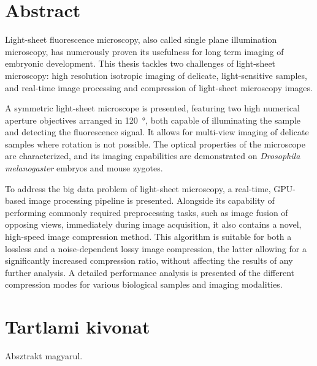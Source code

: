
\chapter*{Abstract}
Light-sheet fluorescence microscopy, also called single plane illumination microscopy, has numerously proven its usefulness for long term imaging of embryonic development. This thesis tackles two challenges of light-sheet microscopy: high resolution isotropic imaging of delicate, light-sensitive samples, and real-time image processing and compression of light-sheet microscopy images.

A symmetric light-sheet microscope is presented, featuring two high numerical aperture objectives arranged in \SI{120}{\degree}, both capable of illuminating the sample and detecting the fluorescence signal. It allows for multi-view imaging of delicate samples where rotation is not possible. The optical properties of the microscope are characterized, and its imaging capabilities are demonstrated on \textit{Drosophila melanogaster} embryos and mouse zygotes.

To address the big data problem of light-sheet microscopy, a real-time, GPU-based image processing pipeline is presented.
Alongside its capability of performing commonly required preprocessing tasks, such as image fusion of opposing views, immediately during image acquisition, it also contains a novel, high-speed image compression method. This algorithm is suitable for both a lossless and a noise-dependent lossy image compression, the latter allowing for a significantly increased compression ratio, without affecting the results of any further analysis.
A detailed performance analysis is presented of the different compression modes for various biological samples and imaging modalities.







\chapter*{Tartlami kivonat}
Absztrakt magyarul.
